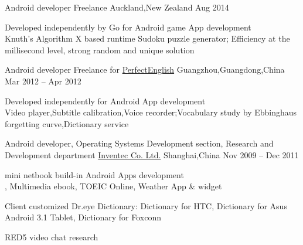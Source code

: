 \begin{cventries}
	\cventry
	{Android developer}
	{Freelance}
	{Auckland,\enskip New Zealand}
	{Aug 2014}
	{
		\begin{cvitems}
			\item {Developed independently by Go for Android \href{https://play.google.com/store/apps/details?id=com.gmail.jiangyang5157.sudoku}{\color{deepblue}{Sudoku}} game App development\\
			Knuth's Algorithm X based runtime Sudoku puzzle generator;\enskip
			Efficiency at the millisecond level, strong random and unique solution}
		\end{cvitems}
	}
\end{cventries}

\begin{cventries}
	\cventry
	{Android developer}
	{Freelance for \href{http://www.english119.cn}{PerfectEnglish}}
	{Guangzhou,\enskip Guangdong,\enskip China}
	{Mar 2012 – Apr 2012}
	{
		\begin{cvitems}
			\item {Developed independently for Android \href{http://shouji.baidu.com/software/11415668.html}{\color{deepblue}{PerfectEnglish}} App development\\
			Video player,\enskip Subtitle calibration,\enskip Voice recorder;\enskip Vocabulary study by Ebbinghaus forgetting curve,\enskip Dictionary service}
		\end{cvitems}
	}
\end{cventries}

\begin{cventries}
	\cventry
	{Android developer, Operating Systems Development section, Research and Development department}
	{\href{http://www.inventec.com/english/indexEN.htm}{Inventec Co. Ltd.}}
	{Shanghai,\enskip China}
	{Nov 2009 – Dec 2011}
	{
		\begin{cvitems}
			\item {\href{http://www.androidcentral.com/android-powered-dr-eye-makes-its-debut}{\color{deepblue}{Dr.eye}} mini netbook build-in Android Apps development\\
			\href{https://play.google.com/store/apps/details?id=com.inventec.dreye.dictnew}{\color{deepblue}{Dr.eye Dictionary}}, Multimedia ebook, TOEIC Online, Weather App \& widget}
			\item {Client customized Dr.eye Dictionary:\enskip
			Dictionary for HTC,\enskip 
			Dictionary for Asus Android 3.1 Tablet,\enskip
			Dictionary for Foxconn}
			\item {RED5 video chat research}
		\end{cvitems}
	}
\end{cventries}

